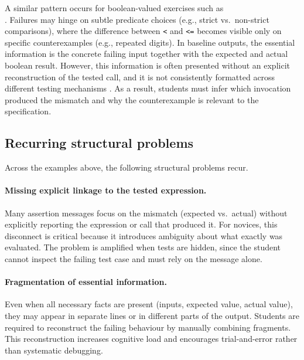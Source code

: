 \begin{justify}
A similar pattern occurs for boolean-valued exercises such as \\
. Failures may hinge on subtle predicate choices
(e.g., strict vs.\ non-strict comparisons), where the difference between \texttt{<} and \texttt{<=}
becomes visible only on specific counterexamples (e.g., repeated digits). In baseline outputs, the
essential information is the concrete failing input together with the expected and actual boolean
result. However, this information is often presented without an explicit reconstruction of the
tested call, and it is not consistently formatted across different testing mechanisms \cite{barik}.
As a result, students must infer which invocation produced the mismatch and why the counterexample
is relevant to the specification.
\end{justify}


\subsection{Recurring structural problems} %
     \label{Recurring structural problems} %


Across the examples above, the following structural problems recur.


\paragraph{Missing explicit linkage to the tested expression.}
    \label{Missing explicit linkage to the tested expression.}
Many assertion messages focus on the mismatch (expected vs.\ actual) without explicitly reporting
the expression or call that produced it. For novices, this disconnect is critical because it
introduces ambiguity about what exactly was evaluated. The problem is amplified when tests are
hidden, since the student cannot inspect the failing test case and must rely on the message alone.


\paragraph{Fragmentation of essential information.}
    \label{Fragmentation of essential information.}
Even when all necessary facts are present (inputs, expected value, actual value), they may appear in
separate lines or in different parts of the output. Students are required to reconstruct the failing
behaviour by manually combining fragments. This reconstruction increases cognitive load and
encourages trial-and-error rather than systematic debugging.


